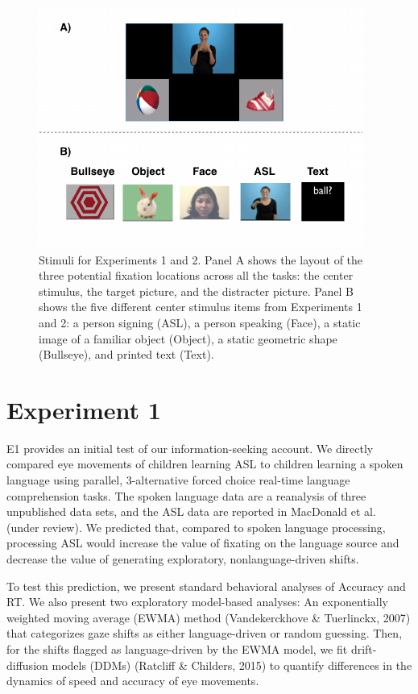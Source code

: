 \documentclass[10pt, letterpaper]{article}
\newenvironment{CodeChunk}{}{}
\begin{document}
\begin{CodeChunk}
\begin{figure}[t]

{\centering \includegraphics{figs/e1_stimuli-1} 

}

\caption[Stimuli for Experiments 1 and 2]{Stimuli for Experiments 1 and 2. Panel A shows the layout of the three potential fixation locations across all the tasks: the center stimulus, the target picture, and the distracter picture. Panel B shows the five different center stimulus items from Experiments 1 and 2: a person signing (ASL), a person speaking (Face), a static image of a familiar object (Object), a static geometric shape (Bullseye), and printed text (Text).}\label{fig:e1_stimuli}
\end{figure}
\end{CodeChunk}

\section{Experiment 1}\label{experiment-1}

E1 provides an initial test of our information-seeking account. We
directly compared eye movements of children learning ASL to children
learning a spoken language using parallel, 3-alternative forced choice
real-time language comprehension tasks. The spoken language data are a
reanalysis of three unpublished data sets, and the ASL data are reported
in MacDonald et al. (under review). We predicted that, compared to
spoken language processing, processing ASL would increase the value of
fixating on the language source and decrease the value of generating
exploratory, nonlanguage-driven shifts.

To test this prediction, we present standard behavioral analyses of
Accuracy and RT. We also present two exploratory model-based analyses:
An exponentially weighted moving average (EWMA) method (Vandekerckhove
\& Tuerlinckx, 2007) that categorizes gaze shifts as either
language-driven or random guessing. Then, for the shifts flagged as
language-driven by the EWMA model, we fit drift-diffusion models (DDMs)
(Ratcliff \& Childers, 2015) to quantify differences in the dynamics of
speed and accuracy of eye movements.
\end{document}
